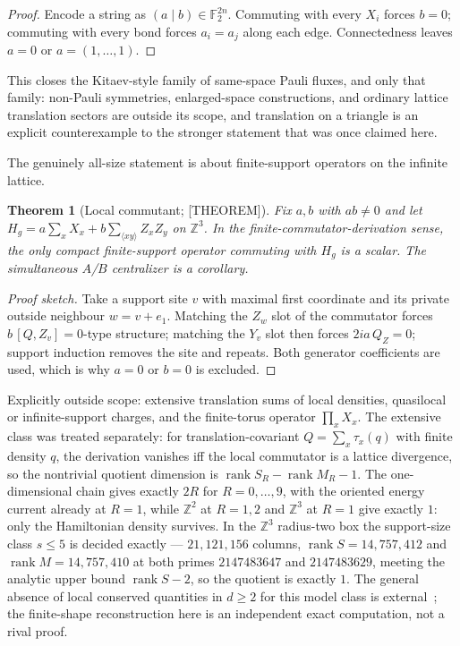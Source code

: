 \documentclass[11pt]{article}
\newtheorem{theorem}{Theorem}[section]
\theoremstyle{definition}
\newcommand{\Fb}{\mathbb{F}}
\newcommand{\Zb}{\mathbb{Z}}
\begin{document}
\begin{proof}
Encode a string as $(a\mid b)\in\Fb_2^{2n}$. Commuting with every $X_i$ forces $b=0$; commuting with
every bond forces $a_i=a_j$ along each edge. Connectedness leaves $a=0$ or $a=(1,\dots,1)$.
\end{proof}

This closes the Kitaev-style family of same-space Pauli fluxes, and only that family: non-Pauli
symmetries, enlarged-space constructions, and ordinary lattice translation sectors are outside its
scope, and translation on a triangle is an explicit counterexample to the stronger statement that was
once claimed here.

The genuinely all-size statement is about finite-support operators on the infinite lattice.

\begin{theorem}[Local commutant; {[THEOREM]}]\label{thm:lc}
Fix $a,b$ with $ab\ne0$ and let $H_g=a\sum_xX_x+b\sum_{\langle xy\rangle}Z_xZ_y$ on $\Zb^3$. In the
finite-commutator-derivation sense, the only compact finite-support operator commuting with $H_g$ is
a scalar. The simultaneous $A$/$B$ centralizer is a corollary.
\end{theorem}

\begin{proof}[Proof sketch]
Take a support site $v$ with maximal first coordinate and its private outside neighbour $w=v+e_1$.
Matching the $Z_w$ slot of the commutator forces $b\,[Q,Z_v]=0$-type structure; matching the $Y_v$
slot then forces $2ia\,Q_Z=0$; support induction removes the site and repeats. Both generator
coefficients are used, which is why $a=0$ or $b=0$ is excluded.
\end{proof}

Explicitly outside scope: extensive translation sums of local densities, quasilocal or
infinite-support charges, and the finite-torus operator $\prod_xX_x$. The extensive class was treated
separately: for translation-covariant $Q=\sum_x\tau_x(q)$ with finite density $q$, the derivation
vanishes iff the local commutator is a lattice divergence, so the nontrivial quotient dimension is
$\operatorname{rank}S_R-\operatorname{rank}M_R-1$. The one-dimensional chain gives exactly $2R$ for
$R=0,\dots,9$, with the oriented energy current already at $R=1$, while $\Zb^2$ at $R=1,2$ and
$\Zb^3$ at $R=1$ give exactly $1$: only the Hamiltonian density survives. In the $\Zb^3$ radius-two
box the support-size class $s\le5$ is decided exactly --- $21{,}121{,}156$ columns,
$\operatorname{rank}S=14{,}757{,}412$ and $\operatorname{rank}M=14{,}757{,}410$ at both primes
$2147483647$ and $2147483629$, meeting the analytic upper bound $\operatorname{rank}S-2$, so the
quotient is exactly $1$. The general absence of local conserved quantities in $d\ge2$ for this model
class is external~\cite{chiba2024}; the finite-shape reconstruction here is an independent exact
computation, not a rival proof.
\end{document}
